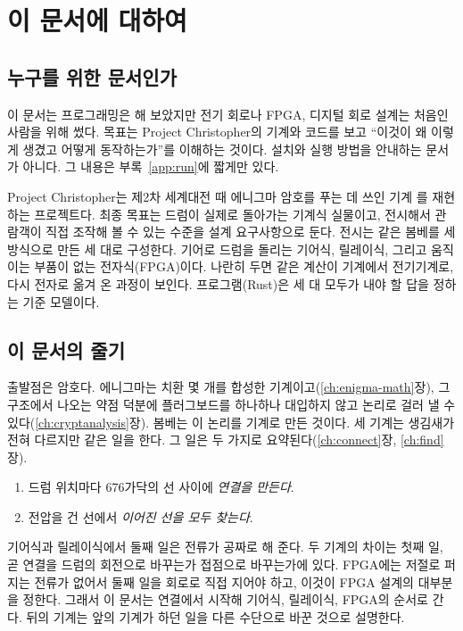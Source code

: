 \chapter{이 문서에 대하여}

\section{누구를 위한 문서인가}

이 문서는 프로그래밍은 해 보았지만 전기 회로나 FPGA, 디지털 회로 설계는 처음인 사람을 위해 썼다. 목표는
Project Christopher의 기계와 코드를 보고 ``이것이 왜 이렇게 생겼고 어떻게 동작하는가''를 이해하는 것이다.
설치와 실행 방법을 안내하는 문서가 아니다. 그 내용은 부록~\ref{app:run}에 짧게만 있다.

Project Christopher는 제2차 세계대전 때 에니그마 암호를 푸는 데 쓰인 기계 를
재현하는 프로젝트다. 최종 목표는 드럼이 실제로 돌아가는 기계식 실물이고, 전시해서 관람객이 직접 조작해
볼 수 있는 수준을 설계 요구사항으로 둔다. 전시는 같은 봄베를 세 방식으로 만든 세 대로 구성한다.
기어로 드럼을 돌리는 기어식, 릴레이식, 그리고 움직이는 부품이 없는 전자식(FPGA)이다. 나란히 두면 같은
계산이 기계에서 전기기계로, 다시 전자로 옮겨 온 과정이 보인다. 프로그램(Rust)은 세 대 모두가 내야 할
답을 정하는 기준 모델이다.

\section{이 문서의 줄기}

출발점은 암호다. 에니그마는 치환 몇 개를 합성한 기계이고(\ref{ch:enigma-math}장), 그 구조에서 나오는 약점 덕분에
플러그보드를 하나하나 대입하지 않고 논리로 걸러 낼 수 있다(\ref{ch:cryptanalysis}장). 봄베는 이 논리를 기계로 만든 것이다.
세 기계는 생김새가 전혀 다르지만 같은 일을 한다. 그 일은 두 가지로 요약된다(\ref{ch:connect}장, \ref{ch:find}장).

\begin{enumerate}
\item 드럼 위치마다 676가닥의 선 사이에 \emph{연결을 만든다}.
\item 전압을 건 선에서 \emph{이어진 선을 모두 찾는다}.
\end{enumerate}

기어식과 릴레이식에서 둘째 일은 전류가 공짜로 해 준다. 두 기계의 차이는 첫째 일, 곧 연결을 드럼의 회전으로
바꾸는가 접점으로 바꾸는가에 있다. FPGA에는 저절로 퍼지는 전류가 없어서 둘째 일을 회로로 직접 지어야 하고,
이것이 FPGA 설계의 대부분을 정한다. 그래서 이 문서는 연결에서 시작해 기어식, 릴레이식, FPGA의 순서로 간다.
뒤의 기계는 앞의 기계가 하던 일을 다른 수단으로 바꾼 것으로 설명한다.

